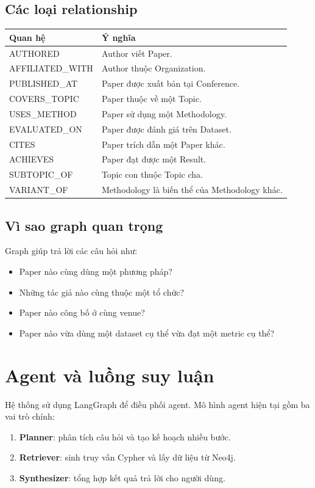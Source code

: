 \documentclass[12pt,a4paper]{article}
\begin{document}
\subsection{Các loại relationship}
\begin{longtable}{>{\raggedright\arraybackslash}p{4cm} p{8cm}}
\toprule
\textbf{Quan hệ} & \textbf{Ý nghĩa} \\
\midrule
AUTHORED & Author viết Paper. \\
AFFILIATED\_WITH & Author thuộc Organization. \\
PUBLISHED\_AT & Paper được xuất bản tại Conference. \\
COVERS\_TOPIC & Paper thuộc về một Topic. \\
USES\_METHOD & Paper sử dụng một Methodology. \\
EVALUATED\_ON & Paper được đánh giá trên Dataset. \\
CITES & Paper trích dẫn một Paper khác. \\
ACHIEVES & Paper đạt được một Result. \\
SUBTOPIC\_OF & Topic con thuộc Topic cha. \\
VARIANT\_OF & Methodology là biến thể của Methodology khác. \\
\bottomrule
\end{longtable}

\subsection{Vì sao graph quan trọng}
Graph giúp trả lời các câu hỏi như:
\begin{itemize}[leftmargin=1.6em]
  \item Paper nào cùng dùng một phương pháp?
  \item Những tác giả nào cùng thuộc một tổ chức?
  \item Paper nào công bố ở cùng venue?
  \item Paper nào vừa dùng một dataset cụ thể vừa đạt một metric cụ thể?
\end{itemize}

\section{Agent và luồng suy luận}
Hệ thống sử dụng LangGraph để điều phối agent. Mô hình agent hiện tại gồm ba vai trò chính:
\begin{enumerate}[leftmargin=1.6em]
  \item \textbf{Planner}: phân tích câu hỏi và tạo kế hoạch nhiều bước.
  \item \textbf{Retriever}: sinh truy vấn Cypher và lấy dữ liệu từ Neo4j.
  \item \textbf{Synthesizer}: tổng hợp kết quả trả lời cho người dùng.
\end{enumerate}
\end{document}
